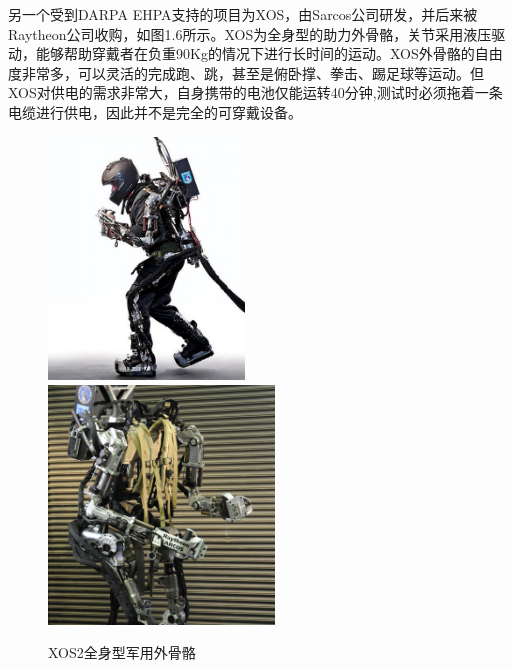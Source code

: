 另一个受到DARPA EHPA支持的项目为XOS\cite{p8}，由Sarcos公司研发，并后来被Raytheon公司收购，如图1.6所示。XOS为全身型的助力外骨骼，关节采用液压驱动，能够帮助穿戴者在负重90Kg的情况下进行长时间的运动。XOS外骨骼的自由度非常多，可以灵活的完成跑、跳，甚至是俯卧撑、拳击、踢足球等运动。但XOS对供电的需求非常大，自身携带的电池仅能运转40分钟,测试时必须拖着一条电缆进行供电，因此并不是完全的可穿戴设备。
\begin{figure}[htb]
    \label{fig:sub1}{\includegraphics[width=5.2cm]{fig/f6_XOS.jpg}}\quad
    \label{fig:sub2}{\includegraphics[width=6cm]{fig/f7_XOS.jpg}}
    \caption{XOS2全身型军用外骨骼\cite{p8}}
    \label{fig:subfigs}
\end{figure}

